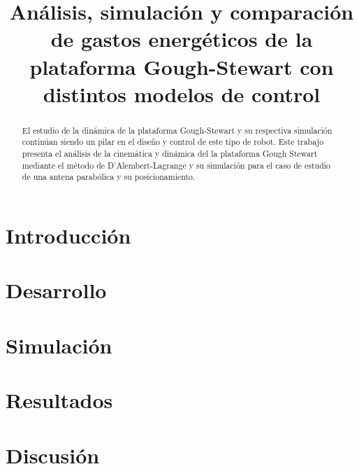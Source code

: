 \documentclass[article]{IEEEtran}
\begin{document}
\title{
Análisis, simulación y comparación de gastos energéticos de la plataforma Gough-Stewart con distintos modelos de control\\
}


\author{
}

\maketitle

\begin{abstract}
El estudio de la dinámica de la plataforma Gough-Stewart y su respectiva simulación continúan siendo un pilar en el diseño y control de este tipo de robot.
Este trabajo presenta el análisis de la cinemática y dinámica del la plataforma Gough Stewart mediante el método de D'Alembert-Lagrange y su simulación para el caso de estudio de una antena parabólica y su posicionamiento.


\end{abstract}


\section{Introducción}


\section{Desarrollo}


\section{Simulación}


\section{Resultados}


\section{Discusión}

\end{document}
